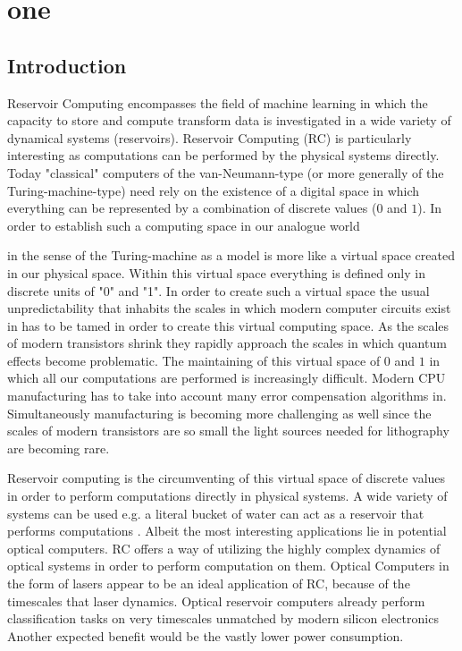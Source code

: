 \chapter{one}

\section{Introduction}

	Reservoir Computing encompasses the field of machine learning in which the capacity to store and compute transform data is investigated in a wide variety of dynamical systems (reservoirs). Reservoir Computing (RC) is particularly interesting as computations can be performed by the physical systems directly. Today "classical" computers of the van-Neumann-type (or more generally of the Turing-machine-type) need rely on the existence of a digital space in which everything can be represented by a combination of discrete values ($0$ and $1$). In order to establish such a computing space in our analogue world  
	
	in the sense of the Turing-machine as a model is more like a virtual space created in our physical space. Within this virtual space everything is defined only in discrete units of "0" and "1". In order to create such a virtual space the usual unpredictability that inhabits the scales in which modern computer circuits exist in has to be tamed in order to create this virtual computing space. As the scales of modern transistors shrink they rapidly approach the scales in which quantum effects become problematic. The maintaining of this virtual space of $0$ and $1$ in which all our computations are performed is increasingly difficult. Modern CPU manufacturing has to take into account many error compensation algorithms in. Simultaneously manufacturing is becoming more challenging as well since the scales of modern transistors are so small the light sources needed for lithography are becoming rare.
	
	Reservoir computing is the circumventing of this virtual space of discrete values in order to perform computations directly in physical systems. A wide variety of systems can be used e.g. a literal bucket of water can act as a reservoir that performs computations \cite{FER03}. Albeit the most interesting applications lie in potential optical computers. RC offers a way of utilizing the highly complex dynamics of optical systems in order to perform computation on them. Optical Computers in the form of lasers appear to be an ideal application of RC, because of the timescales that laser dynamics.  Optical reservoir computers already perform classification tasks on very timescales unmatched by modern silicon electronics \cite{BRU13a}
	Another expected benefit would be the vastly lower power consumption.  
	

